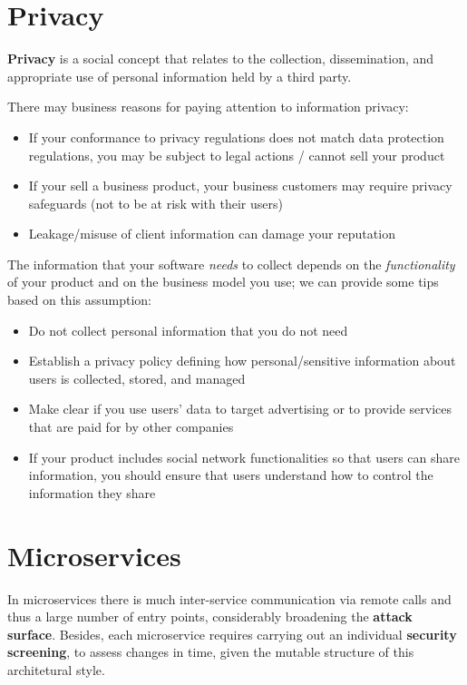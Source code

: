 \section{Privacy}
\textbf{Privacy} is a social concept that relates to the collection,
dissemination, and appropriate use of personal information held
by a third party.

There may business reasons for paying attention to information privacy:
\begin{itemize}
   \item If your conformance to privacy regulations does not match data
   protection regulations, you may be subject to legal actions / cannot sell
   your product
   \item If your sell a business product, your business customers may require privacy safeguards (not to be at risk with their users)
   \item Leakage/misuse of client information can damage your reputation
\end{itemize}

The information that your software \textit{needs} to collect depends on the
\textit{functionality} of your product and on the business model you use;
we can provide some tips based on this assumption:
\begin{itemize}
   \item Do not collect personal information that you do not need
   \item Establish a privacy policy defining how personal/sensitive information about
   users is collected, stored, and managed
   \item Make clear if you use users’ data to target advertising or to provide services that are paid for by other companies
   \item If your product includes social network functionalities so that users can share
   information, you should ensure that users understand how to control the
   information they share
\end{itemize}

\section{Microservices}
In microservices there is much inter-service communication via remote calls and thus a large number of entry points, 
considerably broadening the \textbf{attack surface}.
Besides, each microservice requires carrying out an individual \textbf{security screening},
to assess changes in time, given the mutable structure of this architetural style.

